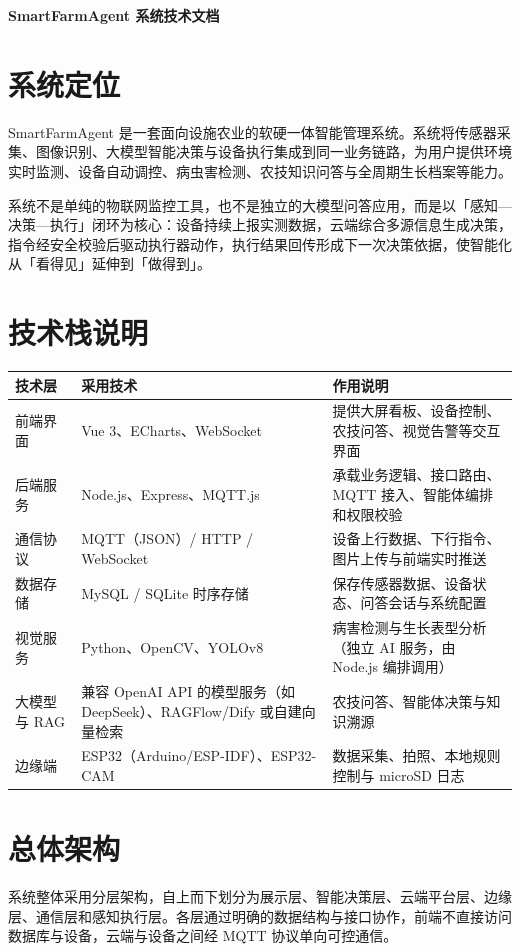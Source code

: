 \documentclass[11pt]{ctexart}
\begin{document}
\begin{center}
  {\LARGE\bfseries SmartFarmAgent 系统技术文档}
\end{center}

\vspace{1.2em}

\section{系统定位}
SmartFarmAgent 是一套面向设施农业的软硬一体智能管理系统。系统将传感器采集、图像识别、大模型智能决策与设备执行集成到同一业务链路，为用户提供环境实时监测、设备自动调控、病虫害检测、农技知识问答与全周期生长档案等能力。

系统不是单纯的物联网监控工具，也不是独立的大模型问答应用，而是以「感知—决策—执行」闭环为核心：设备持续上报实测数据，云端综合多源信息生成决策，指令经安全校验后驱动执行器动作，执行结果回传形成下一次决策依据，使智能化从「看得见」延伸到「做得到」。

\section{技术栈说明}
\begin{longtable}{p{2.4cm}p{4.8cm}p{7.6cm}}
  \toprule
  技术层 & 采用技术 & 作用说明 \\
  \midrule
  前端界面 & Vue 3、ECharts、WebSocket & 提供大屏看板、设备控制、农技问答、视觉告警等交互界面 \\
  后端服务 & Node.js、Express、MQTT.js & 承载业务逻辑、接口路由、MQTT 接入、智能体编排和权限校验 \\
  通信协议 & MQTT（JSON）/ HTTP / WebSocket & 设备上行数据、下行指令、图片上传与前端实时推送 \\
  数据存储 & MySQL / SQLite 时序存储 & 保存传感器数据、设备状态、问答会话与系统配置 \\
  视觉服务 & Python、OpenCV、YOLOv8 & 病害检测与生长表型分析（独立 AI 服务，由 Node.js 编排调用） \\
  大模型与 RAG & 兼容 OpenAI API 的模型服务（如 DeepSeek）、RAGFlow/Dify 或自建向量检索 & 农技问答、智能体决策与知识溯源 \\
  边缘端 & ESP32（Arduino/ESP-IDF）、ESP32-CAM & 数据采集、拍照、本地规则控制与 microSD 日志 \\
  \bottomrule
\end{longtable}

\section{总体架构}
系统整体采用分层架构，自上而下划分为展示层、智能决策层、云端平台层、边缘层、通信层和感知执行层。各层通过明确的数据结构与接口协作，前端不直接访问数据库与设备，云端与设备之间经 MQTT 协议单向可控通信。
\end{document}
